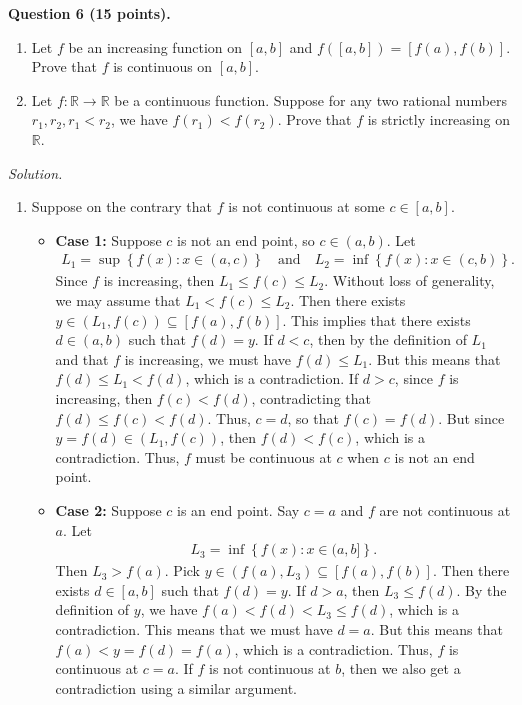 \documentclass[11pt]{amsart}
\theoremstyle{plain}
\numberwithin{equation}{section}
\begin{document}
\newline
\newline\textbf{Question 6 (15 points).}
\begin{enumerate}[label=\textbf{(\roman*)}]
    \itemsep 0em
    \item Let $f$ be an increasing function on $[a,b]$ and $f\left([a,b]\right)=\left[f(a),f(b)\right]$. Prove that $f$ is continuous on $[a,b]$.
    \item Let $f:\mathbb{R}\longrightarrow\mathbb{R}$ be a continuous function. Suppose for any two rational numbers $r_{1},r_{2},r_{1}<r_{2}$, we have $f\left(r_{1}\right)<f\left(r_{2}\right)$. Prove that $f$ is strictly increasing on $\mathbb{R}$. 
\end{enumerate}
\noindent\emph{Solution.}
\begin{enumerate}[label=\textbf{(\roman*)}]
    \itemsep 0em
    \item Suppose on the contrary that $f$ is not continuous at some $c\in[a,b]$. 
    \begin{itemize}
        \itemsep 0em
        \item \textbf{Case 1:} Suppose $c$ is not an end point, so $c\in(a,b)$. Let
        \begin{align*}
    L_{1}=\sup\left\{f(x):x\in\left(a,c\right)\right\}\quad\text{and}\quad 
    L_{2}=\inf\left\{f(x):x\in\left(c,b\right)\right\}.
\end{align*}
Since $f$ is increasing, then $L_{1}\leq f(c)\leq L_{2}$. Without loss of generality, we may assume that $L_{1}<f(c)\leq L_{2}$. Then there exists $y\in\left(L_{1},f(c)\right)\subseteq\left[f(a),f(b)\right]$. This implies that there exists $d\in(a,b)$ such that $f(d)=y$. If $d<c$, then by the definition of $L_{1}$ and that $f$ is increasing, we must have $f(d)\leq L_{1}$. But this means that $f(d)\leq L_{1}<f(d)$, which is a contradiction. If $d>c$, since $f$ is increasing, then $f(c)<f(d)$, contradicting that $f(d)\leq f(c)<f(d)$. Thus, $c=d$, so that $f(c)=f(d)$. But since $y=f(d)\in\left(L_{1},f(c)\right)$, then $f(d)<f(c)$, which is a contradiction. Thus, $f$ must be continuous at $c$ when $c$ is not an end point.
\item \textbf{Case 2:} Suppose $c$ is an end point. Say $c=a$ and $f$ are not continuous at $a$. Let
\begin{align*}
    L_{3}=\inf\left\{f(x):x\in(a,b]\right\}.
\end{align*}
Then $L_{3}>f(a)$. Pick $y\in\left(f(a),L_{3}\right)\subseteq\left[f(a),f(b)\right]$. Then there exists $d\in[a,b]$ such that $f(d)=y$. If $d>a$, then $L_{3}\leq f(d)$. By the definition of $y$, we have $f(a)<f(d)<L_{3}\leq f(d)$, which is a contradiction. This means that we must have $d=a$. But this means that $f(a)<y=f(d)=f(a)$, which is a contradiction. Thus, $f$ is continuous at $c=a$. If $f$ is not continuous at $b$, then we also get a contradiction using a similar argument. 

\end{itemize}
\end{enumerate}
\end{document}
